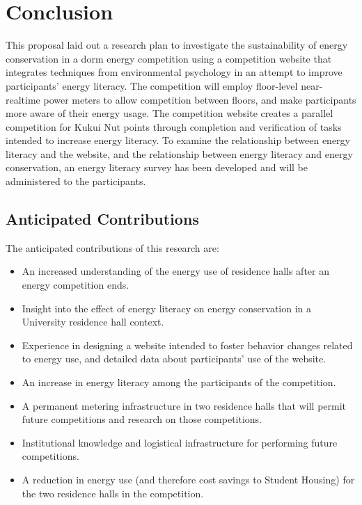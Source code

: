 \chapter{Conclusion}
\label{cha:conclusion}

This proposal laid out a research plan to investigate the sustainability of energy conservation in a dorm energy competition using a competition website that integrates techniques from environmental psychology in an attempt to improve participants' energy literacy. The competition will employ floor-level near-realtime power meters to allow competition between floors, and make participants more aware of their energy usage. The competition website creates a parallel competition for Kukui Nut points through completion and verification of tasks intended to increase energy literacy. To examine the relationship between energy literacy and the website, and the relationship between energy literacy and energy conservation, an energy literacy survey has been developed and will be administered to the participants.

\section{Anticipated Contributions}

The anticipated contributions of this research are:

\begin{itemize}
	\item An increased understanding of the energy use of residence halls after an energy competition ends.
	\item Insight into the effect of energy literacy on energy conservation in a University residence hall context.
	\item Experience in designing a website intended to foster behavior changes related to energy use, and detailed data about participants' use of the website.
	\item An increase in energy literacy among the participants of the competition.
	\item A permanent metering infrastructure in two residence halls that will permit future competitions and research on those competitions.
	\item Institutional knowledge and logistical infrastructure for performing future competitions.
	\item A reduction in energy use (and therefore cost savings to Student Housing) for the two residence halls in the competition.
\end{itemize}

